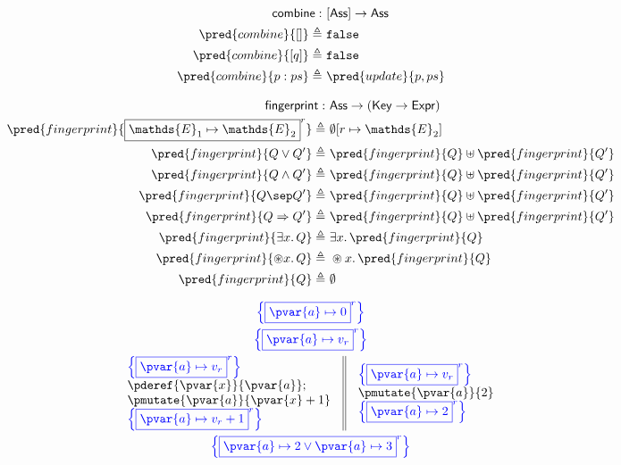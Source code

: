 \begin{align*}
\mathsf{combine} :&\ [\mathsf{Ass}] \rightarrow \mathsf{Ass} \\
\pred{combine}{[]} \triangleq&\ \mathtt{false} \\
\pred{combine}{[q]} \triangleq&\ \mathtt{false} \\
\pred{combine}{p : ps} \triangleq&\ \pred{update}{p, ps}
\end{align*}

\begin{align*}
\mathsf{fingerprint} :&\ \mathsf{Ass} \rightarrow (\mathsf{Key} \rightarrow \mathsf{Expr}) \\
\pred{fingerprint}{\boxed{\mathds{E}_1 \mapsto \mathds{E}_2}^r} \triangleq&\ \emptyset[r \mapsto \mathds{E}_2] \\
\pred{fingerprint}{Q \lor Q'} \triangleq&\ \pred{fingerprint}{Q} \uplus \pred{fingerprint}{Q'} \\
\pred{fingerprint}{Q \land Q'} \triangleq&\ \pred{fingerprint}{Q} \uplus \pred{fingerprint}{Q'} \\
\pred{fingerprint}{Q \sep Q'} \triangleq&\ \pred{fingerprint}{Q} \uplus \pred{fingerprint}{Q'} \\
\pred{fingerprint}{Q \Rightarrow Q'} \triangleq&\ \pred{fingerprint}{Q} \uplus \pred{fingerprint}{Q'} \\
\pred{fingerprint}{\exists x \ldotp Q} \triangleq&\ \exists x \ldotp \pred{fingerprint}{Q} \\
\pred{fingerprint}{\circledast x \ldotp Q} \triangleq&\ \circledast x \ldotp \pred{fingerprint}{Q} \\
\pred{fingerprint}{Q} \triangleq&\ \emptyset
\end{align*}

\iffalse
\begin{gather*}
\color{blue} \left\lbrace \boxed{\pvar{a} \mapsto 0}^r \right\rbrace \\
\color{blue} \left\lbrace \boxed{\pvar{a} \mapsto v_r}^r \right\rbrace \\
\begin{array}{c || c}
\begin{array}{l}
\color{blue} \left\lbrace \boxed{\pvar{a} \mapsto v_r}^r \right\rbrace \\
\pderef{\pvar{x}}{\pvar{a}}; \\
\pmutate{\pvar{a}}{\pvar{x} + 1} \\
\color{blue} \left\lbrace \boxed{\pvar{a} \mapsto v_r + 1}^r \right\rbrace
\end{array}
&
\begin{array}{l}
\color{blue} \left\lbrace \boxed{\pvar{a} \mapsto v_r}^r \right\rbrace \\
\pmutate{\pvar{a}}{2} \\
\color{blue} \left\lbrace \boxed{\pvar{a} \mapsto 2}^r \right\rbrace
\end{array}
\end{array} \\
\color{blue} \left\lbrace \boxed{\pvar{a} \mapsto 2 \lor \pvar{a} \mapsto 3}^r \right\rbrace
\end{gather*}

